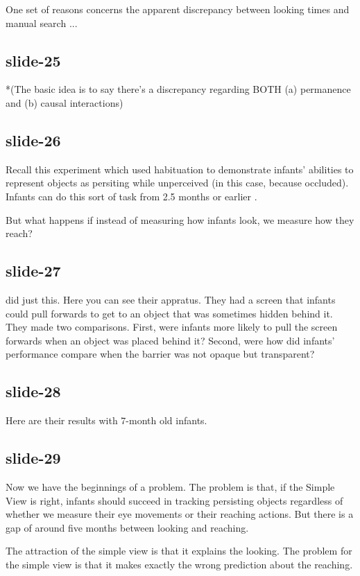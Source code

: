 \documentclass[12pt,\papersize]{extarticle}
\begin{document}
One set of reasons concerns the apparent discrepancy between looking times and manual search ...

\subsection{slide-25}
*(The basic idea is to say there's a discrepancy regarding BOTH (a) permanence and (b)
causal interactions)

\subsection{slide-26}
Recall this experiment which used habituation to demonstrate infants' abilities to represent
objects as persiting while unperceived (in this case, because occluded).
Infants can do this sort of task from 2.5 months or earlier \citep{Aguiar:1999jq}.

But what happens if instead of measuring how infants look, we measure how they reach?

\subsection{slide-27}
\citet{Shinskey:2001fk} did just this.
Here you can see their appratus.
They had a screen that infants could pull forwards to get to an object that was sometimes
hidden behind it.
They made two comparisons.
First, were infants more likely to pull the screen forwards when an object was placed behind it?
Second, were how did infants' performance compare when the barrier was not opaque but transparent?

\subsection{slide-28}
Here are their results with 7-month old infants.

\subsection{slide-29}
Now we have the beginnings of a problem.
The problem is that, if the Simple View is right, infants should succeed in tracking persisting
objects regardless of whether we measure their eye movements or their reaching actions.
But there is a gap of around five months between looking and reaching.

The attraction of the simple view is that it explains the looking.
The problem for the simple view is that it makes exactly the wrong prediction about the reaching.
\end{document}

